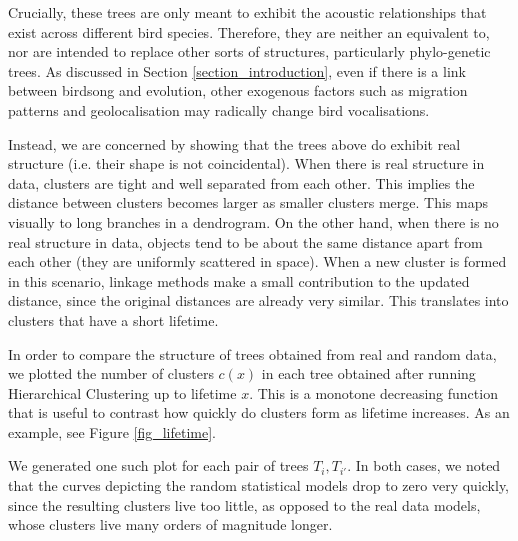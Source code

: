 \documentclass[pdftex,11pt,a4paper]{article}
\theoremstyle{definition}
\theoremstyle{remark}
\begin{document}
\par Crucially, these trees are only meant to exhibit the acoustic relationships that exist across different bird species. Therefore, they are neither an equivalent to, nor are intended to replace other sorts of structures, particularly phylo-genetic trees. As discussed in Section \ref{section_introduction}, even if there is a link between birdsong and evolution, other exogenous factors such as migration patterns and geolocalisation may radically change bird vocalisations.
\par Instead, we are concerned by showing that the trees above do exhibit real structure (i.e. their shape is not coincidental). When there is real structure in data, clusters are tight and well separated from each other. This implies the distance between clusters becomes larger as smaller clusters merge. This maps visually to long branches in a dendrogram. On the other hand, when there is no real structure in data, objects tend to be about the same distance apart from each other (they are uniformly scattered in space). When a new cluster is formed in this scenario, linkage methods make a small contribution to the updated distance, since the original distances are already very similar. This translates into clusters that have a short lifetime.
\par In order to compare the structure of trees obtained from real and random data, we plotted the number of clusters $c(x)$ in each tree obtained after running Hierarchical Clustering up to lifetime $x$. This is a monotone decreasing function that is useful to contrast how quickly do clusters form as lifetime increases. As an example, see Figure \ref{fig_lifetime}.
\par We generated one such plot for each pair of trees $T_i, T_{i'}$. In both cases, we noted that the curves depicting the random statistical models drop to zero very quickly, since the resulting clusters live too little, as opposed to the real data models, whose clusters live many orders of magnitude longer. 

\clearpage
\end{document}
